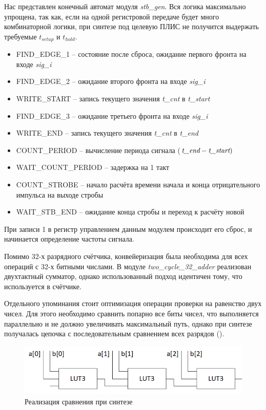 \FloatBarrier

Нас  представлен конечный автомат модуля \emph{stb\_gen}. Вся логика максимально упрощена, так как, если
на одной регистровой передаче будет много комбинаторной логики, при синтезе под целевую ПЛИС не получится выдержать требуемые $ t_{setup} $ и $ t_{hold} $.

\begin{itemize}[label={}]
	\item FIND\_EDGE\_1 -- состояние после сброса, ожидание первого фронта на входе \emph{sig\_i} 
	\item FIND\_EDGE\_2 -- ожидание второго фронта на входе \emph{sig\_i} 
	\item WRITE\_START -- запись текущего значения \emph{t\_cnt} в \emph{t\_start}
	\item FIND\_EDGE\_3 -- ожидание третьего фронта на входе \emph{sig\_i}
	\item WRITE\_END -- запись текущего значения \emph{t\_cnt} в \emph{t\_end}
	\item COUNT\_PERIOD -- вычисление периода сигнала ($ \emph{t\_end} - \emph{t\_start}) $
	\item WAIT\_COUNT\_PERIOD -- задержка на 1 такт
	\item COUNT\_STROBE -- начало расчёта времени начала и конца отрицательного импульса на выходе стробы
	\item WAIT\_STB\_END -- ожидание конца стробы и переход к расчёту новой\\
\end{itemize}

При записи 1 в регистр управлением данным модулем происходит его сброс, и начинается определение частоты сигнала.

Помимо 32-х разрядного счётчика, конвейеризация была необходима для всех операций с 32-х битными числами. В модуле \emph{two\_cycle\_32\_adder}
реализован двухтактный сумматор, однако использованный подход идентичен тому, что используется в счётчике.

Отдельного упоминания стоит оптимизация операции проверки на равенство двух чисел. Для этого необходимо сравнить попарно все биты
чисел, что выполняется параллельно и не должно увеличивать максимальный путь, однако при синтезе получалась цепочка с последовательным
сравнением всех разрядов ().\\

\begin{figure}[ht!] 
	\center
	\includegraphics [scale=0.7] {my_folder/images//eq}
	\caption{Реализация сравнения при синтезе} 
	\label{fig:eq}  
\end{figure}

